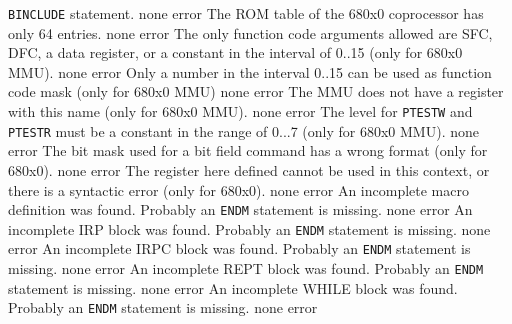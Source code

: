 \documentclass[12pt,twoside]{report}
\newcommand{\tty}[1]{{\tt #1}}
\begin{document}
\begin{description}
{                \tty{BINCLUDE} statement.}
               {none}
               {error}
               {The ROM table of the 680x0 coprocessor has only 64 entries.}
               {none}
               {error}
               {The only function code arguments allowed are SFC, DFC, a
                data register, or a constant in the interval of 0..15 (only
                for 680x0 MMU).}
               {none}
               {error}
               {Only a number in the interval 0..15 can be used as
                function code mask (only for 680x0 MMU)}
               {none}
               {error}
               {The MMU does not have a register with this name (only for
                680x0 MMU).}
               {none}
               {error}
               {The level for \tty{PTESTW} and \tty{PTESTR} must be a constant in the
                range of 0...7 (only for 680x0 MMU).}
               {none}
               {error}
               {The bit mask used for a bit field command has a wrong
                format (only for 680x0).}
               {none}
               {error}
               {The register here defined cannot be used in this context,
                or there is a syntactic error (only for 680x0).}
               {none}
               {error}
               {An incomplete macro definition was found. Probably an
                \tty{ENDM} statement is missing.}
               {none}
               {error}
               {An incomplete IRP block was found. Probably an
                \tty{ENDM} statement is missing.}
               {none}
               {error}
               {An incomplete IRPC block was found. Probably an
                \tty{ENDM} statement is missing.}
               {none}
               {error}
               {An incomplete REPT block was found. Probably an
                \tty{ENDM} statement is missing.}
               {none}
               {error}
               {An incomplete WHILE block was found. Probably an
                \tty{ENDM} statement is missing.}
               {none}
               {error}

\end{description}
\end{document}
